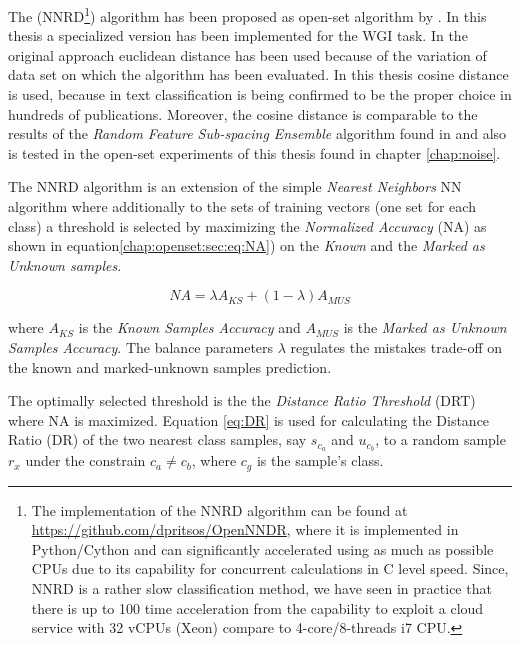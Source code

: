 The  (NNRD\footnote{The implementation of the NNRD algorithm can be found at \url{https://github.com/dpritsos/OpenNNDR}, where it is implemented in Python/Cython and can significantly accelerated using as much as possible CPUs due to its capability for concurrent calculations in C level speed. Since, NNRD is a rather slow classification method, we have seen in practice that there is up to 100 time acceleration from the capability to exploit a cloud service with 32 vCPUs (Xeon) compare to 4-core/8-threads i7 CPU.}) algorithm has been proposed as open-set algorithm by \parencite{mendesjunior2016}. In this thesis a specialized version has been implemented for the WGI task. In the original approach euclidean distance has been used because of the variation of data set on which the algorithm has been evaluated. In this thesis cosine distance is used, because in text classification is being confirmed to be the proper choice in hundreds of publications. Moreover, the cosine distance is comparable to the results of the \textit{Random Feature Sub-spacing Ensemble} algorithm found in \parencite{pritsos2018open} and also is tested in the open-set experiments of this thesis found in chapter \ref{chap:noise}.

The NNRD algorithm is an extension of the simple \textit{Nearest Neighbors} NN algorithm where additionally to the sets of training vectors (one set for each class) a threshold is selected by maximizing the \textit{Normalized Accuracy} (NA) as shown in equation\ref{chap:openset:sec:eq:NA}) on the \textit{Known} and the \textit{Marked as Unknown samples}.

\begin{equation} \label{chap:openset:sec:eq:NA}
    NA = \lambda A_{KS} + (1 - \lambda) A_{MUS}
\end{equation}

\noindent
where $A_{KS}$ is the \textit{Known Samples Accuracy} and $A_{MUS}$ is the \textit{Marked as Unknown Samples Accuracy}. The balance parameters $\lambda$ regulates the mistakes trade-off on the known and marked-unknown samples prediction.

The optimally selected threshold is the the \textit{Distance Ratio Threshold} (DRT) where NA is maximized. Equation \ref{eq:DR} is used for calculating the Distance Ratio (DR) of the two nearest class samples, say $s_{c_{a}}$ and $u_{c_{b}}$, to a random sample $r_{x}$ under the constrain $c_{a} \neq c_{b}$, where $c_{g}$ is the sample's class.

